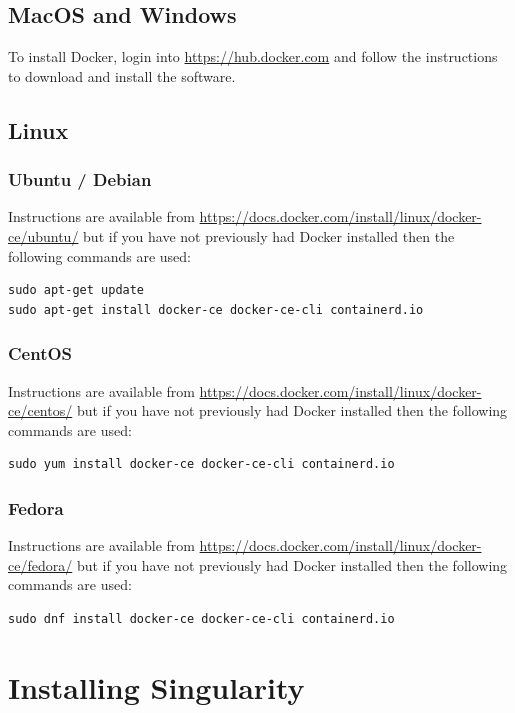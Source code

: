\documentclass[authoryear, 11pt, oneside]{report}
\begin{document}
\subsection{MacOS and Windows}

To install Docker, login into \url{https://hub.docker.com} and follow the instructions to download and install the software.

\subsection{Linux}

\subsubsection{Ubuntu / Debian}
 Instructions are available from \url{https://docs.docker.com/install/linux/docker-ce/ubuntu/} but if you have not previously had Docker installed then the following commands are used:
 
\begin{verbatim}
sudo apt-get update
sudo apt-get install docker-ce docker-ce-cli containerd.io
\end{verbatim}

\subsubsection{CentOS}
 Instructions are available from \url{https://docs.docker.com/install/linux/docker-ce/centos/} but if you have not previously had Docker installed then the following commands are used:
 
\begin{verbatim}
sudo yum install docker-ce docker-ce-cli containerd.io
\end{verbatim}

\subsubsection{Fedora}
 Instructions are available from \url{https://docs.docker.com/install/linux/docker-ce/fedora/} but if you have not previously had Docker installed then the following commands are used:
 
\begin{verbatim}
sudo dnf install docker-ce docker-ce-cli containerd.io
\end{verbatim}

\section{Installing Singularity}
\end{document}
